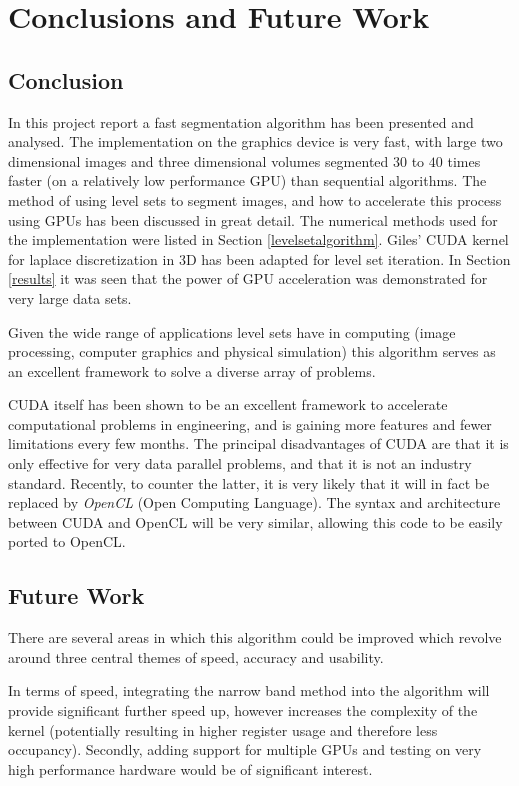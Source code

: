 \chapter{Conclusions and Future Work}
\section{Conclusion}
In this project report a fast segmentation algorithm has been presented and analysed. The implementation on the graphics device is very fast, with large two dimensional images and three dimensional volumes segmented $30$ to $40$ times faster (on a relatively low performance GPU) than sequential algorithms. 
The method of using level sets to segment images, and how to accelerate this process using GPUs has been discussed in great detail. The numerical methods used for the implementation were listed in Section \ref{levelsetalgorithm}. Giles' CUDA kernel for laplace discretization in 3D \cite{mgiles} has been adapted for level set iteration. In Section \ref{results} it was seen that the power of GPU acceleration was demonstrated for very large data sets.

Given the wide range of applications level sets have in computing (image processing, computer graphics and physical simulation) this algorithm serves as an excellent framework to solve a diverse array of problems.
	
CUDA itself has been shown to be an excellent framework to accelerate computational problems in engineering, and is gaining more features and fewer limitations every few months. The principal disadvantages of CUDA are that it is only effective for very data parallel problems, and that it is not an industry standard. Recently, to counter the latter, it is very likely that it will in fact be replaced by \textit{OpenCL} (Open Computing Language). The syntax and architecture between CUDA and OpenCL will be very similar, allowing this code to be easily ported to OpenCL.

\section{Future Work}
There are several areas in which this algorithm could be improved which revolve around three central themes of speed, accuracy and usability. 

In terms of speed, integrating the narrow band method into the algorithm will provide significant further speed up, however increases the complexity of the kernel (potentially resulting in higher register usage and therefore less occupancy). Secondly, adding support for multiple GPUs and testing on very high performance hardware would be of significant interest. 

